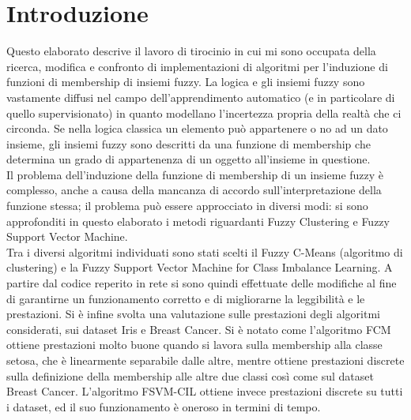 \documentclass[oneside, openany]{book}
\begin{document}
	\chapter*{Introduzione}
		{} 
		Questo elaborato descrive il lavoro di tirocinio in cui mi sono occupata della ricerca, modifica e confronto di implementazioni di algoritmi per l'induzione di funzioni di membership di insiemi fuzzy. La logica e gli insiemi fuzzy sono vastamente diffusi nel campo dell'apprendimento automatico (e in particolare di quello supervisionato) in quanto modellano l'incertezza propria della realtà che ci circonda. Se nella logica classica un elemento può appartenere o no ad un dato insieme, gli insiemi fuzzy sono descritti da una funzione di membership che determina un grado di appartenenza di un oggetto all'insieme in questione.\\
		Il problema dell'induzione della funzione di membership di un insieme fuzzy è complesso, anche a causa della mancanza di accordo sull'interpretazione della funzione stessa; il problema può essere approcciato in diversi modi: si sono approfonditi in questo elaborato i metodi riguardanti Fuzzy Clustering e Fuzzy Support Vector Machine.\\
		Tra i diversi algoritmi individuati sono stati scelti il Fuzzy C-Means (algoritmo di clustering) e la Fuzzy Support Vector Machine for Class Imbalance Learning. A partire dal codice reperito in rete si sono quindi effettuate delle modifiche al fine di garantirne un funzionamento corretto e di migliorarne la leggibilità e le prestazioni. Si è infine svolta una valutazione sulle prestazioni degli algoritmi considerati, sui dataset Iris e Breast Cancer. Si è notato come l'algoritmo FCM ottiene prestazioni molto buone quando si lavora sulla membership alla classe setosa, che è linearmente separabile dalle altre, mentre ottiene prestazioni discrete sulla definizione della membership alle altre due classi così come sul dataset Breast Cancer. L'algoritmo FSVM-CIL ottiene invece prestazioni discrete su tutti i dataset, ed il suo funzionamento è oneroso in termini di tempo.
		
\end{document}
